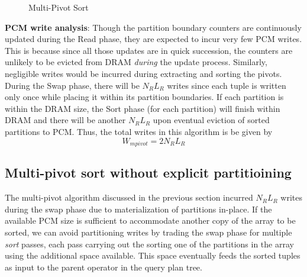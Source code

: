 \begin{figure}[h]
	\centering
	\hspace{0mm}
    \hspace{0mm}
	\caption{Multi-Pivot Sort}
	\label{fig:mpsort}
	
\end{figure}
\textbf{PCM write analysis}: Though the partition boundary counters are continuously updated during the Read phase, they are expected to incur very few PCM writes. This is because since all those updates are in quick succession, the counters are unlikely to be evicted from DRAM  \emph{during} the update process. Similarly, negligible writes would be incurred during extracting and sorting the pivots. During the Swap phase, there will be $N_R L_R$ writes since each tuple is written only once while placing it within its partition boundaries. If each partition is within the DRAM size, the Sort phase (for each partition) will finish within DRAM and there will be another $N_R L_R$ upon eventual eviction of sorted partitions to PCM.  Thus, the total writes in this algorithm is be given by 
\begin{equation}\label{eq:mpivot}
  W_{mpivot} = 2N_RL_R
\end{equation}

\subsection{Multi-pivot sort without explicit partitioining}
The multi-pivot algorithm discussed in the previous section incurred $N_R L_R$ writes during the swap phase due to materialization of partitions in-place. If the available PCM size is sufficient to accommodate another copy of the array to be sorted, we can avoid partitioning writes by trading the swap phase for multiple \textit{sort} passes, each pass carrying out the sorting one of the partitions in the array using the additional space available. This space eventually feeds the sorted tuples as input to the parent operator in the query plan tree. 

